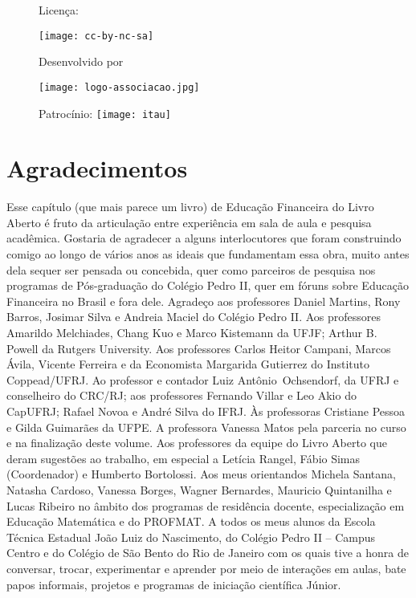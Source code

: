 \begin{figure}[b]
\begin{minipage}[l]{5cm}
\centering

{\large Licença:}

  \texttt{[image: cc-by-nc-sa]}
\end{minipage}\hfill
\begin{minipage}[c]{5cm}
\centering
{\large Desenvolvido por}

\texttt{[image: logo-associacao.jpg]}
\end{minipage}
\begin{minipage}[r]{5cm}
\centering

{\large Patrocínio:}
  \vspace{1em}
  \texttt{[image: itau]}
\end{minipage}
\end{figure}

\cleardoublepage
\def\currentcolor{cor1}
\thispagestyle{empty}

\section{Agradecimentos}

Esse capítulo (que mais parece um livro) de Educação Financeira do Livro Aberto é fruto da articulação entre experiência em sala de aula e pesquisa acadêmica. Gostaria de agradecer a alguns interlocutores que foram construindo comigo ao longo de vários anos as ideais que fundamentam essa obra, muito antes dela sequer ser pensada ou concebida, quer como parceiros de pesquisa nos programas de Pós-graduação do Colégio Pedro II, quer em fóruns sobre Educação Financeira no Brasil e fora dele. Agradeço aos professores Daniel Martins, Rony Barros, Josimar Silva e Andreia Maciel do Colégio Pedro II. Aos professores Amarildo Melchiades, Chang Kuo e Marco Kistemann da UFJF; Arthur B. Powell da Rutgers University. Aos professores Carlos Heitor Campani, Marcos Ávila, Vicente Ferreira e da Economista Margarida Gutierrez do Instituto Coppead/UFRJ. Ao professor e contador Luiz Antônio Ochsendorf, da UFRJ e conselheiro do CRC/RJ; aos professores Fernando Villar e Leo Akio do CapUFRJ; Rafael Novoa e André Silva do IFRJ. Às professoras Cristiane Pessoa e Gilda Guimarães da UFPE. A professora Vanessa Matos pela parceria no curso e na finalização deste
volume. Aos professores da equipe do Livro Aberto que deram sugestões ao trabalho, em especial a Letícia Rangel, Fábio Simas (Coordenador) e Humberto Bortolossi. Aos meus orientandos Michela Santana, Natasha Cardoso, Vanessa Borges, Wagner Bernardes, Mauricio Quintanilha e Lucas Ribeiro no âmbito dos programas de residência docente, especialização em Educação Matemática e do PROFMAT. A todos os meus alunos da Escola Técnica Estadual João Luiz do Nascimento, do Colégio Pedro II – Campus Centro e do Colégio de São Bento do Rio de Janeiro com os quais tive a honra de conversar, trocar, experimentar e aprender por meio de interações em aulas, bate papos informais, projetos e programas de iniciação científica Júnior. 

